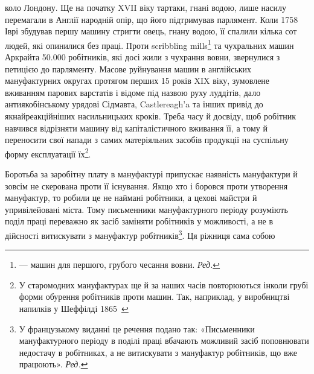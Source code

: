 коло Лондону. Ще на початку XVII віку тартаки,
гнані водою, лише насилу перемагали в Англії народній опір,
що його підтримував парлямент. Коли 1758~ Іврі збудував
першу машину стригти овець, гнану водою, її спалили кілька сот
людей, які опинилися без праці. Проти scribbling mills\footnote*{
— машин для першого, грубого чесання вовни. \emph{Ред.}
} та чухральних машин Аркрайта \num{50.000} робітників, які досі жили з
чухрання вовни, звернулися з петицією до парляменту. Масове
руйнування машин в англійських мануфактурних округах протягом
перших 15 років XIX віку, зумовлене вживанням парових
варстатів і відоме під назвою руху луддітів, дало антиякобінському
урядові Сідмавта, Castlereagh’a та інших привід до
якнайреакційніших насильницьких кроків. Треба часу й досвіду,
щоб робітник навчився відрізняти машину від капіталістичного
вживання її, а тому й переносити свої напади з самих матеріяльних
засобів продукції на суспільну форму експлуатації їх\footnote{
У старомодних мануфактурах ще й за наших часів повторюються
інколи грубі форми обурення робітників проти машин. Так, наприклад,
у виробництві напилків у Шеффілді 1865~
}.

Боротьба за заробітну плату в мануфактурі припускає наявність
мануфактури й зовсім не скерована проти її існування. Якщо
хто і боровся проти утворення мануфактур, то робили це не наймані
робітники, а цехові майстри й упривілейовані міста. Тому письменники
мануфактурного періоду розуміють поділ праці переважно
як засіб заміняти робітників у можливості, а не в дійсності витискувати
з мануфактур робітників\footnote*{
У французькому виданні це речення подано так: «Письменники
мануфактурного періоду в поділі праці вбачають можливий засіб поповнювати
недостачу в робітниках, а не витискувати з мануфактур робітників,
що вже працюють». \emph{Ред.}
}. Ця ріжниця сама собою
\parbreak{}  %
